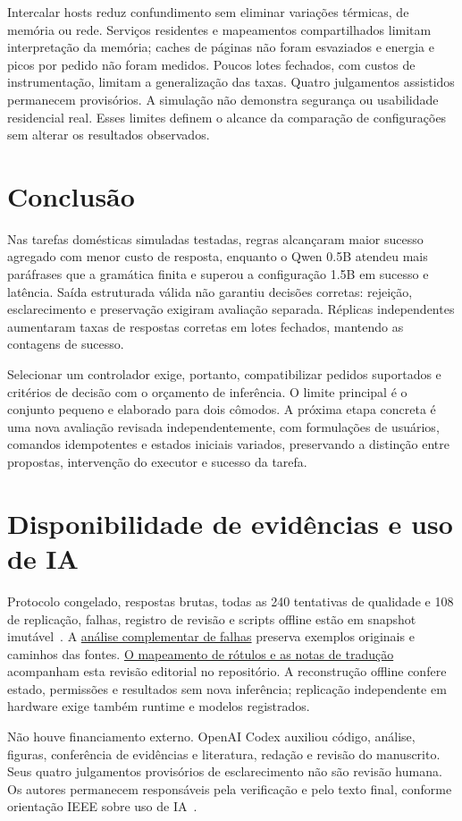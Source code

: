 \documentclass[letterpaper,conference]{IEEEtran}
\providecommand{\StudyPrefix}{}
\begin{document}
Intercalar hosts reduz confundimento sem eliminar variações térmicas, de memória ou rede. Serviços residentes e mapeamentos compartilhados limitam interpretação da memória; caches de páginas não foram esvaziados e energia e picos por pedido não foram medidos. Poucos lotes fechados, com custos de instrumentação, limitam a generalização das taxas. Quatro julgamentos assistidos permanecem provisórios. A simulação não demonstra segurança ou usabilidade residencial real. Esses limites definem o alcance da comparação de configurações sem alterar os resultados observados.

\section{Conclusão}
Nas tarefas domésticas simuladas testadas, regras alcançaram maior sucesso agregado com menor custo de resposta, enquanto o Qwen 0.5B atendeu mais paráfrases que a gramática finita e superou a configuração 1.5B em sucesso e latência. Saída estruturada válida não garantiu decisões corretas: rejeição, esclarecimento e preservação exigiram avaliação separada. Réplicas independentes aumentaram taxas de respostas corretas em lotes fechados, mantendo as contagens de sucesso.

Selecionar um controlador exige, portanto, compatibilizar pedidos suportados e critérios de decisão com o orçamento de inferência. O limite principal é o conjunto pequeno e elaborado para dois cômodos. A próxima etapa concreta é uma nova avaliação revisada independentemente, com formulações de usuários, comandos idempotentes e estados iniciais variados, preservando a distinção entre propostas, intervenção do executor e sucesso da tarefa.

\section*{Disponibilidade de evidências e uso de IA}
Protocolo congelado, respostas brutas, todas as 240 tentativas de qualidade e 108 de replicação, falhas, registro de revisão e scripts offline estão em snapshot imutável~\cite{artifact}. A \href{https://github.com/hudsonmoreira-spec/labrador-distributed-llm-benchmarks/tree/f2f566b179fcf3893099d7d1b12b888455e531ae/experiments/smarthome_agents/analysis/failure-review-20261028}{análise complementar de falhas} preserva exemplos originais e caminhos das fontes. \href{https://github.com/hudsonmoreira-spec/labrador-distributed-llm-benchmarks/tree/c0650b876b5e1a9169782d9cc0819c078b13fbe9/paper/smarthome_agents/study_v1/editorial_20261029}{O mapeamento de rótulos e as notas de tradução} acompanham esta revisão editorial no repositório. A reconstrução offline confere estado, permissões e resultados sem nova inferência; replicação independente em hardware exige também runtime e modelos registrados.

Não houve financiamento externo. OpenAI Codex auxiliou código, análise, figuras, conferência de evidências e literatura, redação e revisão do manuscrito. Seus quatro julgamentos provisórios de esclarecimento não são revisão humana. Os autores permanecem responsáveis pela verificação e pelo texto final, conforme orientação IEEE sobre uso de IA~\cite{ieeeai}.
\balance


\end{document}
